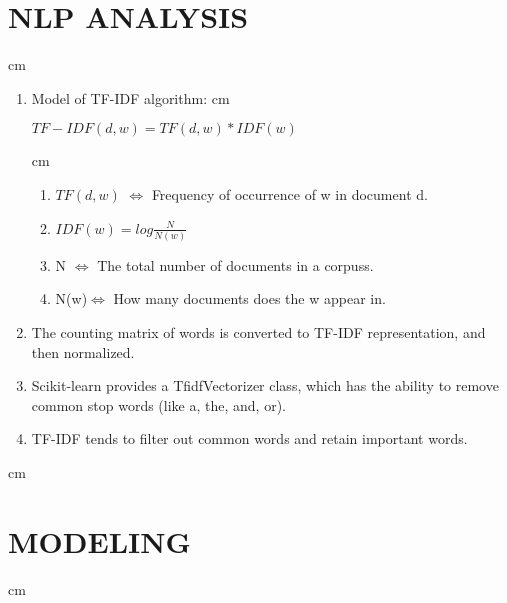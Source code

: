 \vskip 0.5cm%
\section{NLP ANALYSIS} \label{sec-method}
 cm%
\setlength{\parindent}{2em}

\begin{enumerate}[1]
  \item
  Model of TF-IDF algorithm:
   cm%
  
  \begin{centering}
   
  $ TF-IDF (d, w) = TF (d, w) *IDF(w)$
  
  
  \end{centering}
   cm%
  \begin{enumerate}
  
  \item
  $TF(d,w)$ $\Leftrightarrow$ Frequency of occurrence of w in document d.
  \item
  $IDF(w) = log\frac{N}{N(w)}$
  \item
  N $\Leftrightarrow$ The total number of documents in a corpuss.
  \item
  N(w)$\Leftrightarrow$ How many documents does the w appear in.
  \end{enumerate}
  \item
            The counting matrix of words is converted to TF-IDF representation, and then normalized.
            \item
            Scikit-learn provides a TfidfVectorizer class, which has the ability to remove common stop words (like a, the, and, or).
            \item
            TF-IDF tends to filter out common words and retain important words.
            
\end{enumerate}
\newpage

 cm%
\section{MODELING} \label{sec-experiment}
 cm%


